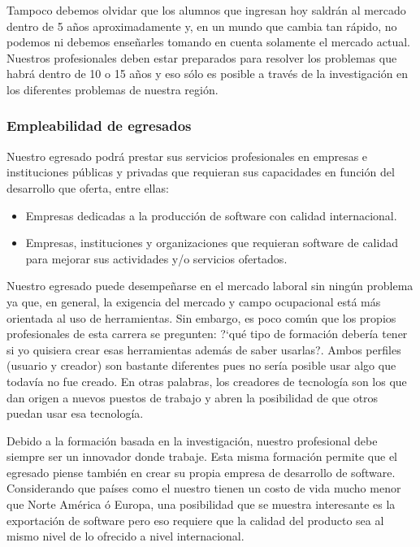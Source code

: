 Tampoco debemos olvidar que los alumnos que ingresan hoy saldrán al mercado dentro de 5 años aproximadamente y, 
en un mundo que cambia tan rápido, no podemos ni debemos enseñarles tomando en cuenta solamente el mercado actual. 
Nuestros profesionales deben estar preparados para resolver los problemas que habrá dentro de 10 o 15 años y 
eso sólo es posible a través de la investigación en los diferentes problemas de nuestra región.


\subsubsection{Empleabilidad de egresados}
Nuestro egresado podrá prestar sus servicios profesionales en empresas e instituciones públicas y privadas que requieran 
sus capacidades en función del desarrollo que oferta, entre ellas:

\begin{itemize}
\item Empresas dedicadas a la producción de software con calidad internacional.
\item Empresas, instituciones y organizaciones que requieran software de calidad para mejorar sus actividades y/o servicios ofertados.
\end{itemize}


Nuestro egresado puede desempeñarse en el mercado laboral sin ningún problema ya que, en general, la exigencia del 
mercado y campo ocupacional está más orientada al uso de herramientas. Sin embargo, es poco común que los propios 
profesionales de esta carrera se pregunten: ?`qué tipo de formación deberí­a tener si yo quisiera crear esas herramientas además de saber usarlas?.  
Ambos perfiles (usuario y creador) son bastante diferentes pues no serí­a posible usar algo que todaví­a no fue creado. 
En otras palabras, los creadores de tecnologí­a son los que dan origen a nuevos puestos de trabajo y abren 
la posibilidad de que otros puedan usar esa tecnologí­a.

Debido a la formación basada en la investigación, nuestro profesional debe siempre ser un innovador donde trabaje. 
Esta misma formación permite que el egresado piense también en crear su propia empresa de desarrollo de software. 
Considerando que paí­ses como el nuestro tienen un costo de vida mucho menor que Norte América ó Europa, una 
posibilidad que se muestra interesante es la exportación de software pero eso requiere que la calidad del 
producto sea al mismo nivel de lo ofrecido a nivel internacional.

